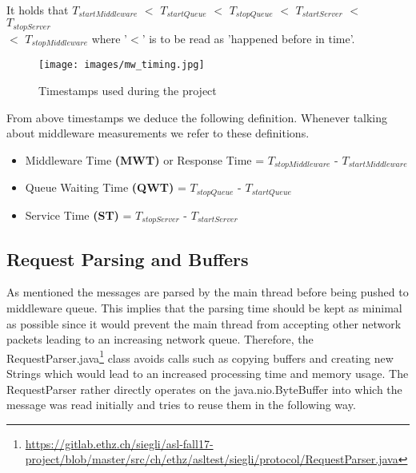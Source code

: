 \documentclass[11pt,a4paper]{article}
\let\tb\textbf
\begin{document}
It holds that $T_{startMiddleware}$ $<$ $T_{startQueue}$ $<$ $T_{stopQueue}$ $<$ $T_{startServer}$ $<$ $T_{stopServer}$  \\$<$ $T_{stopMiddleware}$ where '$<$' is to be read as 'happened before in time'.\\

\begin{figure}
    \centering
    \texttt{[image: images/mw\_timing.jpg]}
    \caption{Timestamps used during the project}
    \label{fig:timestamps}
\end{figure}

From above timestamps we deduce the following definition. Whenever talking about middleware measurements we refer to these definitions.

\begin{itemize}
    \item Middleware Time \tb{(MWT)} or Response Time  =  $T_{stopMiddleware}$ - $T_{startMiddleware}$
    \item Queue Waiting Time \tb{(QWT)} =  $T_{stopQueue}$ - $T_{startQueue}$
    \item Service Time \tb{(ST)} =  $T_{stopServer}$ - $T_{startServer}$
\end{itemize}


\subsection{Request Parsing and Buffers}\label{sub:req_parsing_buffers}
As mentioned the messages are parsed by the main thread before being pushed to middleware queue. This implies that the parsing time should be kept as minimal as possible since it would prevent the main thread from accepting other network packets leading to an increasing network queue. Therefore, the RequestParser.java\footnote{\url{https://gitlab.ethz.ch/siegli/asl-fall17-project/blob/master/src/ch/ethz/asltest/siegli/protocol/RequestParser.java}} class avoids calls such as copying buffers and creating new Strings which would lead to an increased processing time and memory usage. The RequestParser rather directly operates on the java.nio.ByteBuffer into which the message was read initially and tries to reuse them in the following way.
\end{document}

